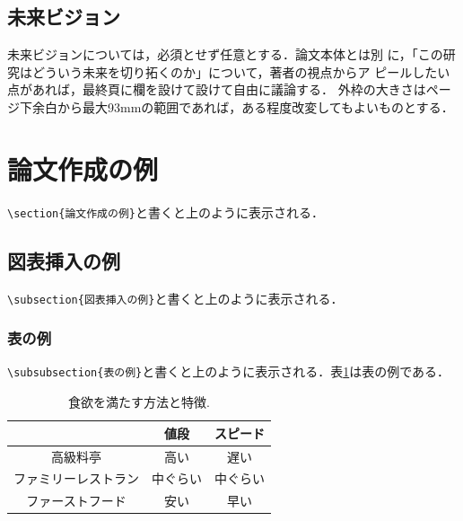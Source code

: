 \documentclass[twoside]{wiss}
\begin{document}
\subsection{未来ビジョン}
未来ビジョンについては，必須とせず任意とする．論文本体とは別
に，「この研究はどういう未来を切り拓くのか」について，著者の視点からア
ピールしたい点があれば，最終頁に欄を設けて設けて自由に議論する．
外枠の大きさはページ下余白から最大93mmの範囲であれば，ある程度改変してもよいものとする．

\section{論文作成の例}

\verb|\section{論文作成の例}|と書くと上のように表示される．

\subsection{図表挿入の例}

\verb|\subsection{図表挿入の例}|と書くと上のように表示される．

\subsubsection{表の例}

\verb|\subsubsection{表の例}|と書くと上のように表示される．表\ref{tab:restaurant}は表の例である．

\begin{table}[htb]
	\caption{食欲を満たす方法と特徴.}
	\label{tab:restaurant}
	\begin{center}
		\begin{tabular}{c|c|c}\hline\hline
			           & 値段   & スピード \\\hline
			高級料亭       & 高い   & 遅い   \\
			ファミリーレストラン & 中ぐらい & 中ぐらい \\
			ファーストフード   & 安い   & 早い   \\
			\hline\hline
		\end{tabular}
	\end{center}
\end{table}
\end{document}
